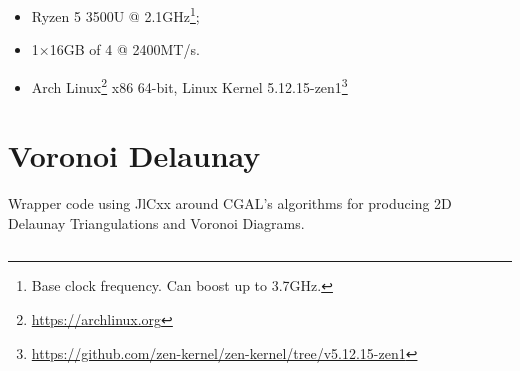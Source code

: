 \begin{itemize}
  \item {}\label{acro:AMD} Ryzen\textsuperscript{\texttrademark} 5 3500U
  \label{acro:CPU} @ 2.1GHz\footnote{Base clock frequency.  Can boost
  up to 3.7GHz.};
  \item 1×16GB \label{acro:SO-DIMM} of \label{acro:DDR}4
  \label{acro:RAM} @ 2400MT/s.
  \item Arch
  Linux\textsuperscript{\texttrademark}\footnote{\url{https://archlinux.org}}
  x86 64-bit, Linux{\textregistered} Kernel
  5.12.15-zen1\footnote{\url{https://github.com/zen-kernel/zen-kernel/tree/v5.12.15-zen1}}
\end{itemize}
\clearpage






\section{Voronoi Delaunay}%
\label{sec:eval.vdjl}

\begin{longlisting}
  \caption[JlCxx wrapper around CGAL's Delaunay algorithms]{
    Wrapper code using JlCxx around \ac{CGAL}'s algorithms for producing
    2D Delaunay Triangulations and Voronoi Diagrams.}%
  \label{lst:eval.vdjl.jlcxx}
  \inputminted{cpp}{cpp/voronoi.cpp} 
\end{longlisting}

